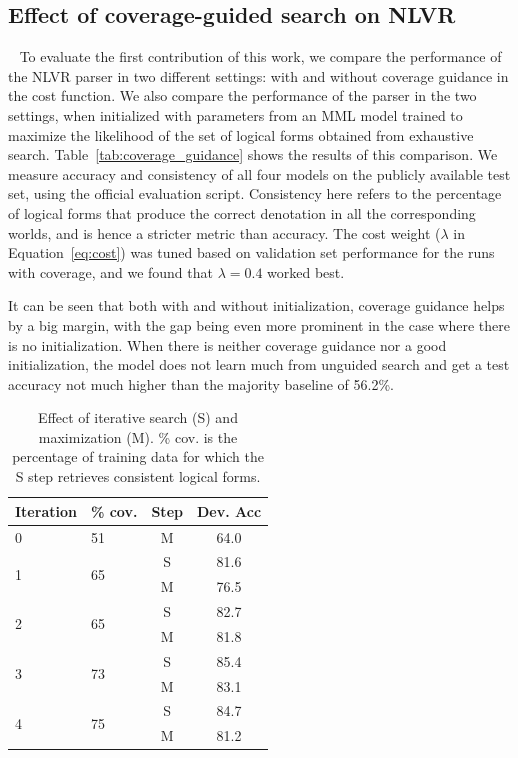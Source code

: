 \subsection{Effect of coverage-guided search on NLVR}~\label{sec:results_coverage}
To evaluate the first contribution of this work, we compare the performance
of the NLVR parser in two different settings: with and without coverage guidance
in the cost function. We also compare the performance of the parser in the two
settings, when initialized with parameters from an MML model trained to maximize
the likelihood of the set of logical forms obtained from exhaustive search.
Table~\ref{tab:coverage_guidance} shows the results of this comparison. We
measure accuracy and consistency of all four models on the publicly available
test set, using the official evaluation script. Consistency here refers to the
percentage of logical forms that produce the correct denotation in all the
corresponding worlds, and is hence a stricter metric than accuracy. The cost
weight ($\lambda$ in Equation~\ref{eq:cost}) was tuned based on validation set
performance for the runs with coverage, and we found that $\lambda = 0.4$ worked
best.

It can be seen that both with and without initialization, coverage guidance
helps by a big margin, with the gap being even more prominent in the case where
there is no initialization. When there is neither coverage guidance nor a good
initialization, the model does not learn much from unguided search and get a
test accuracy not much higher than the majority baseline of 56.2\%.

\begin{table}
	\centering
	\begin{tabular}{llcc}
	\toprule
	Iteration & \% cov. & Step & Dev. Acc  \\
	\midrule
	0 & 51 & M & 64.0 \\
	\hline
	\multirow{2}{*}{1} & \multirow{2}{*}{65} & S & 81.6  \\
	& &  M & 76.5  \\
	\hline
	\multirow{2}{*}{2} & \multirow{2}{*}{65} & S & 82.7  \\
	& &  M & 81.8  \\
	\hline
	\multirow{2}{*}{3} & \multirow{2}{*}{73} & S & 85.4  \\
	& &  M & 83.1  \\
	\hline
	\multirow{2}{*}{4} & \multirow{2}{*}{75} & S & 84.7  \\
	& &  M & 81.2  \\
	\bottomrule
	\end{tabular}
	\caption{Effect of iterative search (S) and maximization (M). \% cov. is the percentage of training data for which the S step retrieves consistent logical forms.}\label{tab:iterative_search_nlvr}
\end{table}

